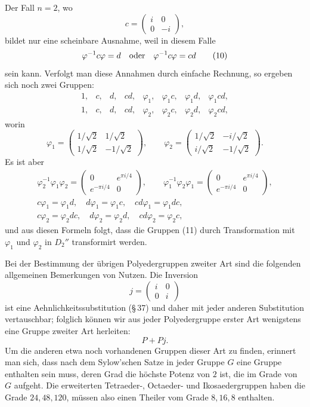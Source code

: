 \documentclass[11pt]{article}
\begin{document}
Der Fall $n=2$, wo
\[
 c=\begin{pmatrix}i&0\\0&-i\end{pmatrix},
\]
bildet nur eine scheinbare Ausnahme, weil in diesem Falle
\begin{equation}
 \varphi^{-1}c\varphi=d\quad \hbox{oder}\quad
 \varphi^{-1}c\varphi=cd \tag{10}
\end{equation}
sein kann. Verfolgt man diese Annahmen durch einfache Rechnung, so ergeben sich noch zwei Gruppen:
\begin{equation}
\begin{array}{cccccccc}
1,&c,&d,&cd,&\varphi_1,&\varphi_1c,&\varphi_1d,&\varphi_1cd,\\
1,&c,&d,&cd,&\varphi_2,&\varphi_2c,&\varphi_2d,&\varphi_2cd,
\end{array} \tag{11}
\end{equation}
worin
\[
 \varphi_1=\begin{pmatrix}1/\sqrt2&1/\sqrt2\\1/\sqrt2&-1/\sqrt2\end{pmatrix},\qquad
 \varphi_2=\begin{pmatrix}1/\sqrt2&-i/\sqrt2\\i/\sqrt2&-1/\sqrt2\end{pmatrix}.
\]
Es ist aber
\[
\begin{gathered}
 \varphi_2^{-1}\varphi_1\varphi_2=
 \begin{pmatrix}0&e^{\pi i/4}\\ e^{-\pi i/4}&0\end{pmatrix},\qquad
 \varphi_1^{-1}\varphi_2\varphi_1=
 \begin{pmatrix}0&e^{\pi i/4}\\ e^{-\pi i/4}&0\end{pmatrix},\\
 c\varphi_1=\varphi_1d,\quad d\varphi_1=\varphi_1c,\quad
 cd\varphi_1=\varphi_1dc,\\
 c\varphi_2=\varphi_2dc,\quad d\varphi_2=\varphi_2d,\quad
 cd\varphi_2=\varphi_2c,
\end{gathered}
\]
und aus diesen Formeln folgt, dass die Gruppen (11) durch Transformation mit $\varphi_1$ und $\varphi_2$ in $D_2''$ transformirt werden.

Bei der Bestimmung der übrigen Polyedergruppen zweiter Art sind die folgenden allgemeinen Bemerkungen von Nutzen. Die Inversion
\[
 j=\begin{pmatrix}i&0\\0&i\end{pmatrix}
\]
ist eine Aehnlichkeitssubstitution (\S\,37) und daher mit jeder anderen Substitution vertauschbar; folglich können wir aus jeder Polyedergruppe erster Art wenigstens eine Gruppe zweiter Art herleiten:
\begin{equation}
 P+Pj. \tag{12}
\end{equation}
Um die anderen etwa noch vorhandenen Gruppen dieser Art zu finden, erinnert man sich, dass nach dem Sylow'schen Satze in jeder Gruppe $G$ eine Gruppe enthalten sein muss, deren Grad die höchste Potenz von $2$ ist, die im Grade von $G$ aufgeht. Die erweiterten Tetraeder-, Octaeder- und Ikosaedergruppen haben die Grade $24,48,120$, müssen also einen Theiler vom Grade $8,16,8$ enthalten.
\end{document}
